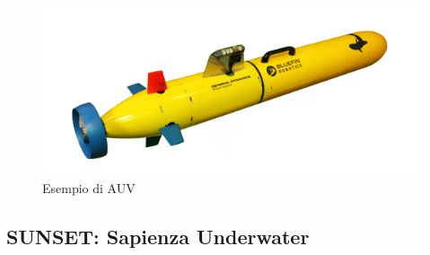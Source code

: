 \begin{figure}[H]
    \centering
	\includegraphics[width=\linewidth]{auv.png}
	\caption{ Esempio di AUV}
	\label{fig:}
\end{figure}

\subsection{SUNSET: Sapienza Underwater }

